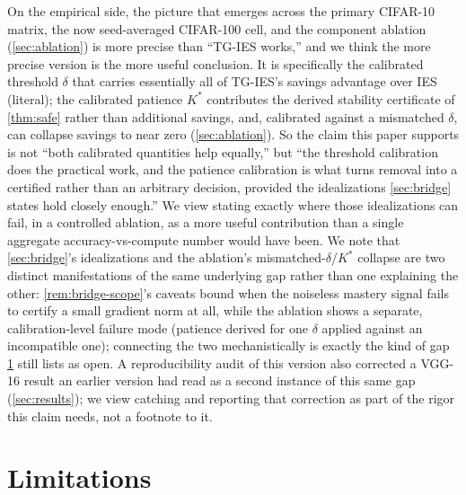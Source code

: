 \documentclass{article}
\theoremstyle{plain}
\theoremstyle{definition}
\theoremstyle{remark}
\begin{document}
On the empirical side, the picture that emerges across the primary CIFAR-10 matrix, the now seed-averaged CIFAR-100 cell, and the component ablation (\cref{sec:ablation}) is more precise than ``TG-IES works,'' and we think the more precise version is the more useful conclusion. It is specifically the calibrated threshold $\delta$ that carries essentially all of TG-IES's savings advantage over IES (literal); the calibrated patience $K^*$ contributes the derived stability certificate of \cref{thm:safe} rather than additional savings, and, calibrated against a mismatched $\delta$, can collapse savings to near zero (\cref{sec:ablation}). So the claim this paper supports is not ``both calibrated quantities help equally,'' but ``the threshold calibration does the practical work, and the patience calibration is what turns removal into a certified rather than an arbitrary decision, provided the idealizations \cref{sec:bridge} states hold closely enough.'' We view stating exactly where those idealizations can fail, in a controlled ablation, as a more useful contribution than a single aggregate accuracy-vs-compute number would have been. We note that \cref{sec:bridge}'s idealizations and the ablation's mismatched-$\delta$/$K^*$ collapse are two distinct manifestations of the same underlying gap rather than one explaining the other: \cref{rem:bridge-scope}'s caveats bound when the noiseless mastery signal fails to certify a small gradient norm at all, while the ablation shows a separate, calibration-level failure mode (patience derived for one $\delta$ applied against an incompatible one); connecting the two mechanistically is exactly the kind of gap \cref{sec:limitations} still lists as open. A reproducibility audit of this version also corrected a VGG-16 result an earlier version had read as a second instance of this same gap (\cref{sec:results}); we view catching and reporting that correction as part of the rigor this claim needs, not a footnote to it.

\section{Limitations}
\label{sec:limitations}
\end{document}
